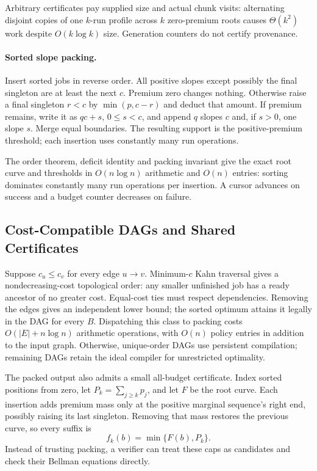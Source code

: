 \documentclass[acmsmall,screen,review,anonymous]{acmart}
\begin{document}
Arbitrary certificates pay supplied size and actual chunk visits: alternating disjoint copies of one $k$-run profile across $k$ zero-premium roots causes $\Theta(k^2)$ work despite $O(k\log k)$ size. Generation counters do not certify provenance.

\paragraph{Sorted slope packing.}
Insert sorted jobs in reverse order. All positive slopes except possibly the final singleton are at least the next $c$. Premium zero changes nothing. Otherwise raise a final singleton $r<c$ by $\min(p,c-r)$ and deduct that amount. If premium remains, write it as $qc+s$, $0\le s<c$, and append $q$ slopes $c$ and, if $s>0$, one slope $s$. Merge equal boundaries. The resulting support is the positive-premium threshold; each insertion uses constantly many run operations.

The order theorem, deficit identity and packing invariant give the exact root curve and thresholds in $O(n\log n)$ arithmetic and $O(n)$ entries: sorting dominates constantly many run operations per insertion. A cursor advances on success and a budget counter decreases on failure.

\subsection{Cost-Compatible DAGs and Shared Certificates}
\label{sec:compatible}

Suppose $c_u\le c_v$ for every edge $u\to v$. Minimum-$c$ Kahn traversal gives a nondecreasing-cost topological order: any smaller unfinished job has a ready ancestor of no greater cost. Equal-cost ties must respect dependencies. Removing the edges gives an independent lower bound; the sorted optimum attains it legally in the DAG for every $B$. Dispatching this class to packing costs $O(|E|+n\log n)$ arithmetic operations, with $O(n)$ policy entries in addition to the input graph. Otherwise, unique-order DAGs use persistent compilation; remaining DAGs retain the ideal compiler for unrestricted optimality.

The packed output also admits a small all-budget certificate. Index sorted positions from zero, let $P_k=\sum_{j\ge k}p_j$, and let $F$ be the root curve. Each insertion adds premium mass only at the positive marginal sequence's right end, possibly raising its last singleton. Removing that mass restores the previous curve, so every suffix is
\begin{equation}
 f_k(b)=\min\{F(b),P_k\}.\label{eq:suffixcap}
\end{equation}
Instead of trusting packing, a verifier can treat these caps as candidates and check their Bellman equations directly.
\end{document}
